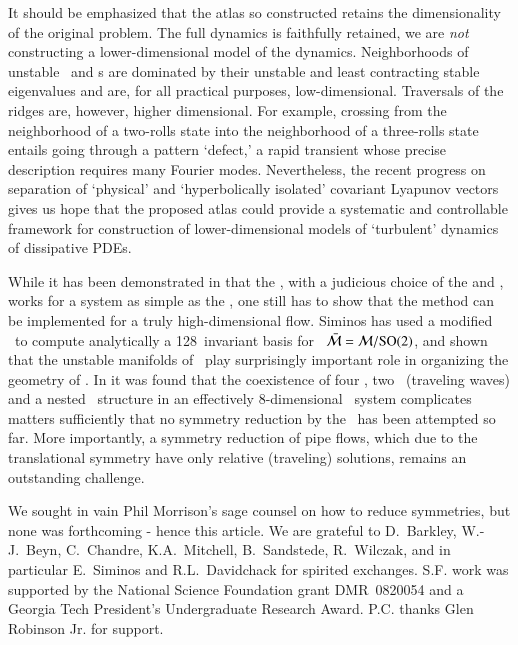 \documentclass[preprint,12pt]{elsarticle} %
\begin{document}
It should be emphasized that the atlas so constructed retains the
dimensionality of the original problem. The full dynamics is faithfully
retained, we are \emph{not} constructing a lower-dimensional model of the
dynamics. Neighborhoods of unstable \eqva\ and \po s are dominated by
their unstable and least contracting stable eigenvalues and are, for all
practical purposes, low-dimensional. Traversals of the ridges are,
however, higher dimensional. For example, crossing from the neighborhood
of a two-rolls state into the neighborhood of a three-rolls state entails
going through a pattern `defect,' a rapid transient whose precise
description requires many Fourier modes. Nevertheless, the recent
progress on separation of `physical' and `hyperbolically isolated'
covariant Lyapunov
vectors gives us
hope that the proposed atlas could provide a systematic and controllable
framework for construction of lower-dimensional models of `turbulent'
dynamics of dissipative PDEs.

While it has been demonstrated in   that the \mframes,
with a judicious choice of the {\template} and {\PoincSec}, works for a
system as simple as the \cLf, one still has to show that the method can
be implemented for a truly high-dimensional flow.
Siminos has used a modified \mframes\ to compute
analytically a 128\dmn\ invariant basis for \reducedsp\ $\bar{\cal M}
= {\cal M}/\textrm{SO}(2)$, and shown that the unstable manifolds of \reqva\ play
surprisingly important role in organizing the geometry of \KS.
In  it
was found that the coexistence of four \eqva, two \reqva\
(traveling waves) and a
nested \fixedsp\ structure in an effectively $8$-dimensional \KS\ system
complicates matters sufficiently that no symmetry reduction by the \mslices\ has been
attempted so far.
More importantly, a symmetry reduction of pipe flows, which
due to the translational symmetry have only relative (traveling)
solutions, remains an outstanding challenge\rf{ACHKW11}.

	\medskip
We sought in vain Phil Morrison's sage counsel on how to reduce
symmetries, but none was forthcoming - hence this article. We are
grateful to
D.~Barkley,
W.-J.~Beyn,
C.~Chandre,
K.A.~Mitchell,
B.~Sandstede,
R.~Wilczak,
and in particular E.~Siminos and R.L.~Davidchack
for spirited exchanges.
S.F. work was supported by the National Science Foundation grant
DMR~0820054 and a Georgia Tech President's Undergraduate Research Award.
P.C. thanks Glen Robinson Jr. for support. 	
\appendix
\end{document}
